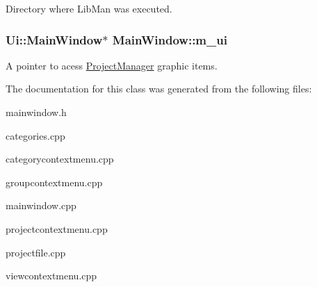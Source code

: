 Directory where Lib\-Man was executed. \hypertarget{classMainWindow_a5a3eb262660797d9a4d52ed16edb6d11}{
\subsubsection[{m\-\_\-ui}]{\setlength{\rightskip}{0pt plus 5cm}Ui\-::\-Main\-Window$\ast$ Main\-Window\-::m\-\_\-ui\hspace{0.3cm}{\ttfamily [private]}}}\label{classMainWindow_a5a3eb262660797d9a4d52ed16edb6d11}
A pointer to acess \hyperlink{classProjectManager}{Project\-Manager} graphic items. 

The documentation for this class was generated from the following files\-:\begin{DoxyCompactItemize}
\item 
mainwindow.\-h\item 
categories.\-cpp\item 
categorycontextmenu.\-cpp\item 
groupcontextmenu.\-cpp\item 
mainwindow.\-cpp\item 
projectcontextmenu.\-cpp\item 
projectfile.\-cpp\item 
viewcontextmenu.\-cpp\end{DoxyCompactItemize}
